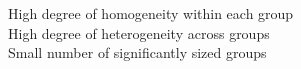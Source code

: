 \documentclass[preview]{standalone}
\begin{document}
High degree of homogeneity within each group\\High degree of heterogeneity across groups\\Small number of significantly sized groups\\
\end{document}

